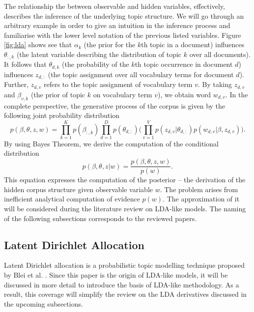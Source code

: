 \documentclass{mprop}
\begin{document}
\par The relationship the between observable and hidden variables, effectively, describes the inference of the underlying topic structure. We will go through an arbitrary example in order to give an intuition in the inference process and familiarise with the lower level notation of the previous listed variables. Figure \ref{fig:lda} shows see that $\alpha_k$ (the prior for the $k$th topic in a document) influences $\theta_{:, k}$ (the latent variable describing the distribution of topic $k$ over all documents). It follows that $\theta_{d, k}$ (the probability of the $k$th topic occurrence in document $d$) influences $z_{d, :}$ (the topic assignment over all vocabulary terms for document $d$). Further, $z_{d, v}$ refers to the topic assignment of vocabulary term $v$. By taking $z_{d, v}$ and $\beta_{v, k}$ (the prior of topic $k$ on vocabulary term $v$), we obtain word $w_{d, v}$. In the complete perspective, the generative process of the corpus is given by the following joint probability distribution
\begin{equation}
p(\beta, \theta, z, w) = \prod_{k=1}^Kp(\beta_{:, k})\prod_{d=1}^Dp(\theta_{d, :})\bigg(\prod_{v=1}^Vp(z_{d, v} | \theta_{d, :})p(w_{d, v} | \beta, z_{d, v})\bigg).
\end{equation}
By using Bayes Theorem, we derive the computation of the conditional distribution
\begin{equation}
p(\beta, \theta, z | w) = \frac{p(\beta, \theta, z, w)}{p(w)}. 
\end{equation}
This equation expresses the computation of the posterior -- the derivation of the hidden corpus structure given observable variable $w$. The problem arises from inefficient analytical computation of evidence $p(w)$. The approximation of it will be considered during the literature review on LDA-like models. The naming of the following subsections corresponds to the reviewed papers. 

\subsection{Latent Dirichlet Allocation}

\par Latent Dirichlet allocation is a probabilistic topic modelling technique proposed by Blei et al. \cite{blei_2003}. Since this paper is the origin of LDA-like models, it will be discussed in more detail to introduce the basis of LDA-like methodology. As a result, this coverage will simplify the review on the LDA derivatives discussed in the upcoming subsections. 
\end{document}
